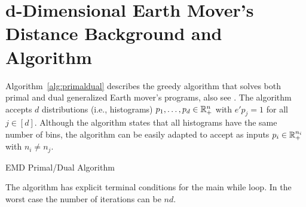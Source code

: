 \section{d-Dimensional Earth Mover's Distance Background and Algorithm}\label{sec:suppdemd}
Algorithm~\ref{alg:primaldual} describes the greedy algorithm that solves both primal and dual generalized Earth mover's programs, also see \citep{kline2019properties}. The algorithm accepts $d$ distributions (i.e., histograms) $p_1,\ldots,p_d\in\mathbb{R}^{n}_+$ with $e'p_j=1$ for all $j\in[d]$. 
Although the algorithm states that all histograms have the same number of bins, the algorithm can be 
easily adapted to accept as inputs $p_i\in\mathbb{R}^{n_i}_+$ with $n_i\not=n_j$.
\begin{algorithm}
	\caption{ \label{alg:primaldual} EMD Primal/Dual Algorithm}
	\SetAlgoLined
	\DontPrintSemicolon
\end{algorithm}
The algorithm has explicit terminal conditions for the main while loop. In the worst case the number of iterations can be $nd$.